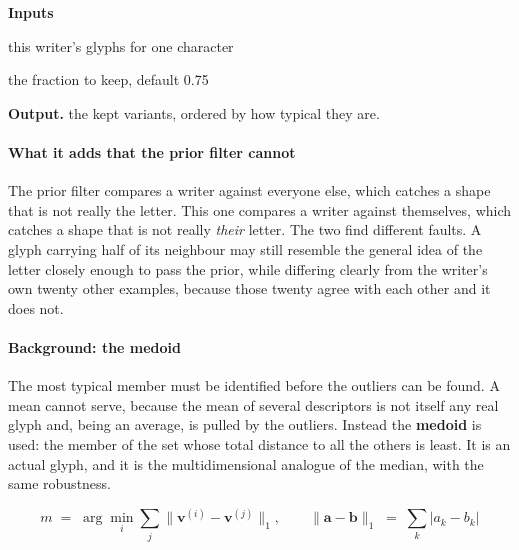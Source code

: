 \noindent\textbf{Inputs}
\begin{description}[leftmargin=2.2em,style=nextline,font=\normalfont\ttfamily]\setlength\itemsep{1pt}
  \item[{variants}] \normalfont this writer's glyphs for one character
  \item[{keepFrac}] \normalfont the fraction to keep, default 0.75
\end{description}

\noindent\textbf{Output.} the kept variants, ordered by how typical they are.


\paragraph{What it adds that the prior filter cannot}
The prior filter compares a writer against everyone else, which catches a shape that is not really the letter. This one compares a writer against themselves, which catches a shape that is not really \emph{their} letter. The two find different faults. A glyph carrying half of its neighbour may still resemble the general idea of the letter closely enough to pass the prior, while differing clearly from the writer's own twenty other examples, because those twenty agree with each other and it does not.


\paragraph{Background: the medoid}
The most typical member must be identified before the outliers can be found. A mean cannot serve, because the mean of several descriptors is not itself any real glyph and, being an average, is pulled by the outliers. Instead the \textbf{medoid} is used: the member of the set whose total distance to all the others is least. It is an actual glyph, and it is the multidimensional analogue of the median, with the same robustness.


\begin{equation}
m \;=\; \arg\min_{i} \sum_{j} \big\| \mathbf{v}^{(i)} - \mathbf{v}^{(j)} \big\|_{1}, \qquad \big\|\mathbf{a} - \mathbf{b}\big\|_{1} \;=\; \sum_{k} \big| a_k - b_k \big|
\end{equation}

